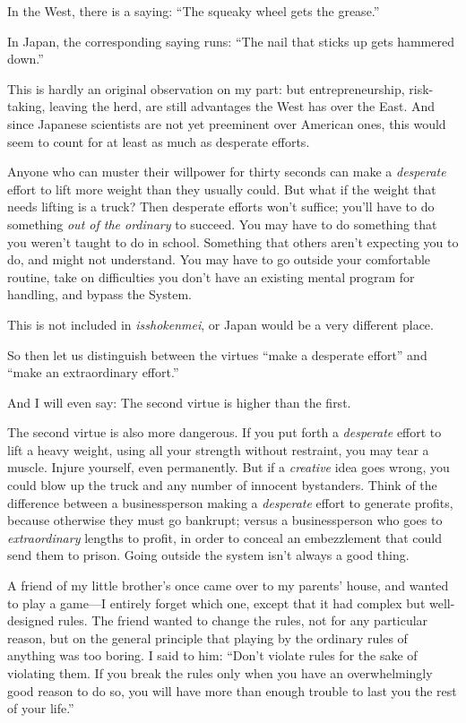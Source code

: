{
 In the West, there is a saying: ``The squeaky
wheel gets the grease.''}

{
 In Japan, the corresponding saying runs: ``The
nail that sticks up gets hammered down.''}

{
 This is hardly an original observation on my part: but
entrepreneurship, risk-taking, leaving the herd, are still advantages
the West has over the East. And since Japanese scientists are not yet
preeminent over American ones, this would seem to count for at least as
much as desperate efforts.}

{
 Anyone who can muster their willpower for thirty seconds can make
a \textit{desperate} effort to lift more weight than they usually
could. But what if the weight that needs lifting is a truck? Then
desperate efforts won't suffice; you'll
have to do something \textit{out of the ordinary} to succeed. You may
have to do something that you weren't taught to do in
school. Something that others aren't expecting you to
do, and might not understand. You may have to go outside your
comfortable routine, take on difficulties you don't
have an existing mental program for handling, and bypass the System.}

{
 This is not included in \textit{isshokenmei}, or Japan would be a
very different place.}

{
 So then let us distinguish between the virtues
``make a desperate effort'' and
``make an extraordinary effort.''}

{
 And I will even say: The second virtue is higher than the first.}

{
 The second virtue is also more dangerous. If you put forth a
\textit{desperate} effort to lift a heavy weight, using all your
strength without restraint, you may tear a muscle. Injure yourself,
even permanently. But if a \textit{creative} idea goes wrong, you could
blow up the truck and any number of innocent bystanders. Think of the
difference between a businessperson making a \textit{desperate} effort
to generate profits, because otherwise they must go bankrupt; versus a
businessperson who goes to \textit{extraordinary} lengths to profit, in
order to conceal an embezzlement that could send them to prison. Going
outside the system isn't always a good thing.}

{
 A friend of my little brother's once came over to
my parents' house, and wanted to play a game---I
entirely forget which one, except that it had complex but well-designed
rules. The friend wanted to change the rules, not for any particular
reason, but on the general principle that playing by the ordinary rules
of anything was too boring. I said to him:
``Don't violate rules for the sake of
violating them. If you break the rules only when you have an
overwhelmingly good reason to do so, you will have more than enough
trouble to last you the rest of your life.''}

